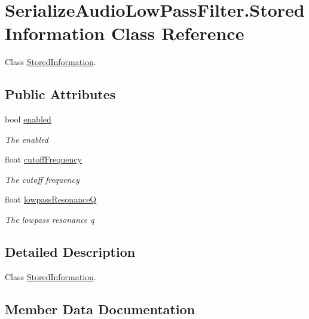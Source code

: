 \hypertarget{class_serialize_audio_low_pass_filter_1_1_stored_information}{}\section{Serialize\+Audio\+Low\+Pass\+Filter.\+Stored\+Information Class Reference}
\label{class_serialize_audio_low_pass_filter_1_1_stored_information}


Class \hyperlink{class_serialize_audio_low_pass_filter_1_1_stored_information}{Stored\+Information}.  


\subsection*{Public Attributes}
\begin{DoxyCompactItemize}
\item 
bool \hyperlink{class_serialize_audio_low_pass_filter_1_1_stored_information_a42854bafd9f6c28aa8bb0728ea5c1c3c}{enabled}
\begin{DoxyCompactList}\small\item\em The enabled \end{DoxyCompactList}\item 
float \hyperlink{class_serialize_audio_low_pass_filter_1_1_stored_information_ab1614cb1acaf00072f48d290de361b99}{cutoff\+Frequency}
\begin{DoxyCompactList}\small\item\em The cutoff frequency \end{DoxyCompactList}\item 
float \hyperlink{class_serialize_audio_low_pass_filter_1_1_stored_information_a8a19c55d7044c2ebd3cdbb71cf2f97aa}{lowpass\+ResonanceQ}
\begin{DoxyCompactList}\small\item\em The lowpass resonance q \end{DoxyCompactList}\end{DoxyCompactItemize}


\subsection{Detailed Description}
Class \hyperlink{class_serialize_audio_low_pass_filter_1_1_stored_information}{Stored\+Information}. 



\subsection{Member Data Documentation}
\mbox{\label{class_serialize_audio_low_pass_filter_1_1_stored_information_ab1614cb1acaf00072f48d290de361b99}} 

